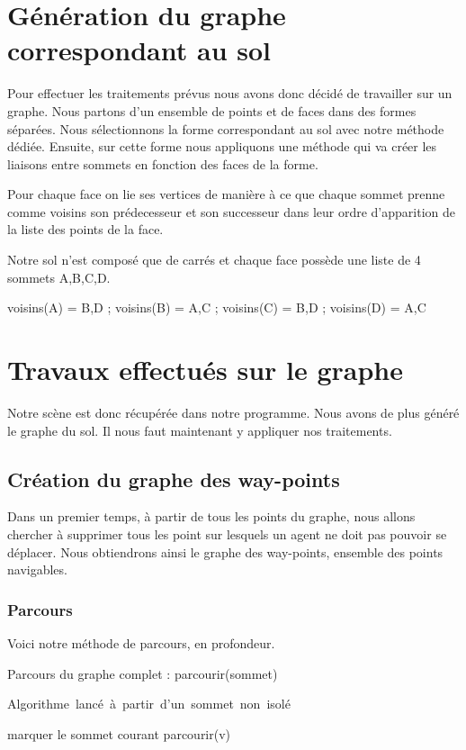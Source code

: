 \documentclass[a4paper,12pt]{report}
\begin{document}
\section{Génération du graphe correspondant au sol}

Pour effectuer les traitements prévus nous avons donc décidé de travailler sur un graphe. Nous partons d'un ensemble de points et de faces dans des formes séparées. Nous sélectionnons la forme correspondant au sol avec notre méthode dédiée. Ensuite, sur cette forme nous appliquons une méthode qui va créer les liaisons entre sommets en fonction des faces de la forme. 

Pour chaque face on lie ses vertices de manière à ce que chaque sommet prenne comme voisins son prédecesseur et son successeur dans leur ordre d'apparition de la liste des points de la face.

Notre sol n'est composé que de carrés et chaque face possède une liste de 4 sommets A,B,C,D.

voisins(A) = {B,D} ;  voisins(B) = {A,C} ; voisins(C) = {B,D} ; voisins(D) = {A,C}

\section{Travaux effectués sur le graphe}

Notre scène est donc récupérée dans notre programme. Nous avons de plus généré le graphe du sol. Il nous faut maintenant y appliquer nos traitements.

\subsection{Création du graphe des way-points}

Dans un premier temps, à partir de tous les points du graphe, nous allons chercher à supprimer tous les point sur lesquels un agent ne doit pas pouvoir se déplacer. Nous obtiendrons ainsi le graphe des way-points, ensemble des points navigables.

\subsubsection{Parcours}

Voici notre méthode de parcours, en profondeur. 

\begin{algorithm}[h]
\caption{Parcours du graphe complet : parcourir(sommet)}
\label{parcours_graphe}
\mbox{Algorithme lancé à partir d'un sommet non isolé}
\begin{algorithmic}[1]
  \STATE marquer le sommet courant
    \STATE parcourir(v)
  \ENDFOR
\ENDIF
\end{algorithmic}
\end{algorithm}
\end{document}
